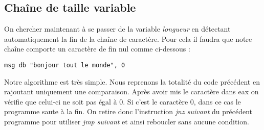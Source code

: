 \subsection{Chaîne de taille variable}

\noindent On chercher maintenant à se passer de la variable \textit{longueur} en détectant automatiquement la fin de la chaîne de caractère. Pour cela il faudra que notre chaîne comporte un caractère de fin nul comme ci-dessous :
\begin{lstlisting}[language={[x86masm]Assembler}]
msg db "bonjour tout le monde", 0
\end{lstlisting}

Notre algorithme est très simple. Nous reprenons la totalité du code précédent en rajoutant uniquement une comparaison. Après avoir mis le caractère dans eax on vérifie que celui-ci ne soit pas égal à 0. Si c'est le caractère 0, dans ce cas le programme saute à la fin. On retire donc l'instruction \textit{jnz     suivant} du précédent programme pour utiliser \textit{jmp     suivant} et ainsi reboucler sans aucune condition.

